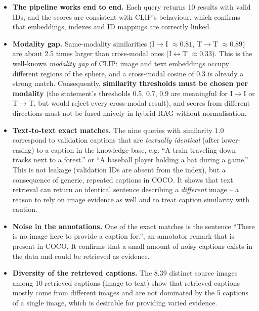 \documentclass[11pt,a4paper]{article}
\renewcommand{\_}{\textunderscore\allowbreak{}}
\begin{document}
\begin{interp}
\begin{itemize}[nosep]
  \item \textbf{The pipeline works end to end.} Each query returns 10 results with valid IDs, and the scores are consistent with CLIP's behaviour, which confirms that embeddings, indexes and ID mappings are correctly linked.
  \item \textbf{Modality gap.} Same-modality similarities (I$\to$I $\approx0.81$, T$\to$T $\approx0.89$) are about 2.5 times larger than cross-modal ones (I$\leftrightarrow$T $\approx0.33$). This is the well-known \emph{modality gap} of CLIP: image and text embeddings occupy different regions of the sphere, and a cross-modal cosine of 0.3 is already a strong match. Consequently, \textbf{similarity thresholds must be chosen per modality} (the statement's thresholds 0.5, 0.7, 0.9 are meaningful for I$\to$I or T$\to$T, but would reject every cross-modal result), and scores from different directions must not be fused naively in hybrid RAG without normalisation.
  \item \textbf{Text-to-text exact matches.} The nine queries with similarity $1.0$ correspond to validation captions that are \emph{textually identical} (after lower-casing) to a caption in the knowledge base, e.g. ``A train traveling down tracks next to a forest.'' or ``A baseball player holding a bat during a game.'' This is not leakage (validation IDs are absent from the index), but a consequence of generic, repeated captions in COCO. It shows that text retrieval can return an identical sentence describing a \emph{different} image -- a reason to rely on image evidence as well and to treat caption similarity with caution.
  \item \textbf{Noise in the annotations.} One of the exact matches is the sentence ``There is no image here to provide a caption for.'', an annotator remark that is present in COCO. It confirms that a small amount of noisy captions exists in the data and could be retrieved as evidence.
  \item \textbf{Diversity of the retrieved captions.} The 8.39 distinct source images among 10 retrieved captions (image-to-text) show that retrieved captions mostly come from different images and are not dominated by the 5 captions of a single image, which is desirable for providing varied evidence.
\end{itemize}
\end{interp}


\end{document}
